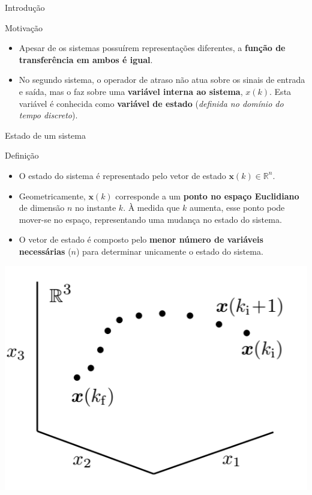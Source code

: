 \begin{frame}{Introdução}
\begin{block}{Motivação}
	\begin{itemize}
		\item Apesar de os sistemas possuírem representações diferentes, a \textbf{função de transferência em ambos é igual}.
		\item No segundo sistema, o operador de atraso não atua sobre os sinais de  entrada e saída, mas o faz sobre uma \textbf{variável interna ao sistema}, $x(k)$. Esta variável é conhecida como \textbf{variável de estado} (\textit{definida no domínio do tempo discreto}).
	\end{itemize}
\end{block}
\end{frame}

\begin{frame}{Estado de um sistema}
\begin{block}{Definição}
	\begin{itemize}
		\item O estado do sistema é representado pelo vetor de estado $\bm{x}(k) \in \mathbb{R}^n$.
		\item Geometricamente, $\bm{x}(k)$ corresponde a um \textbf{ponto no espaço Euclidiano} de dimensão $n$ no instante $k$. À medida que $k$ aumenta, esse ponto pode mover-se no espaço, representando uma mudança no estado  do sistema.
		\item O vetor de estado é composto pelo \textbf{menor número de variáveis necessárias} ($n$) para determinar unicamente o estado do sistema.
	\end{itemize}
\end{block}
\centerline{\includegraphics[width=0.4\linewidth]{Figuras/Ch14/fig3.PNG}}
\end{frame}


